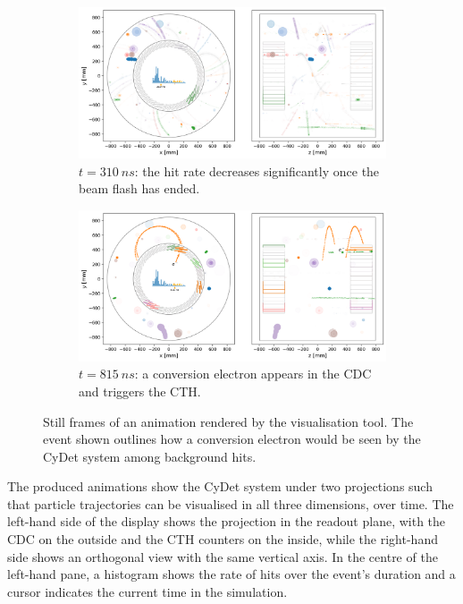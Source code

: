 \begin{figure}
    \begin{subfigure}[t]{0.49\textwidth}
    \centering
    \includegraphics[width=\textwidth]{chapter3/frame_067.png}
    \caption{$t=\SI{310}{ns}$: the hit rate decreases significantly once the beam flash has ended.}
    \end{subfigure}
    \hfill
    \begin{subfigure}[t]{0.49\textwidth}
    \centering
    \includegraphics[width=\textwidth]{chapter3/frame_192.png}
    \caption{$t=\SI{815}{ns}$: a conversion electron appears in the CDC and triggers the CTH.}
    \label{fig:animation:conv}
    \end{subfigure}
    
    \caption{Still frames of an animation rendered by the visualisation tool. The event shown outlines how a conversion electron would be seen by the CyDet system among background hits.}
    \label{fig:animation}
\end{figure}


The produced animations show the CyDet system under two projections such that particle trajectories can be visualised in all three dimensions, over time. The left-hand side of the display shows the projection in the readout plane, with the CDC on the outside and the CTH counters on the inside, while the right-hand side shows an orthogonal view with the same vertical axis.
In the centre of the left-hand pane, a histogram shows the rate of hits over the event's duration and a cursor indicates the current time in the simulation.

